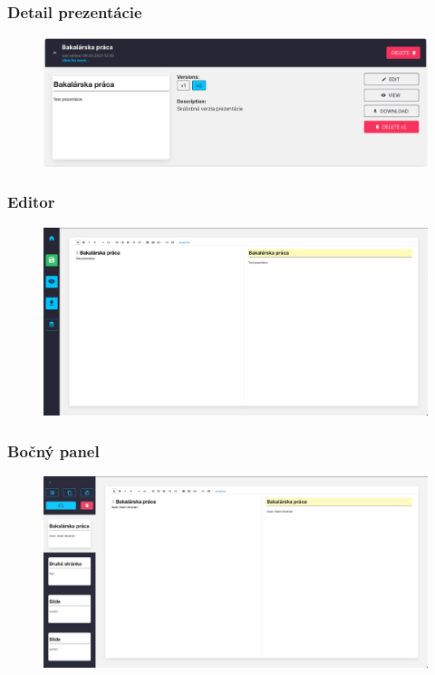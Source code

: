 \documentclass[10pt,xcolor=pdflatex,hyperref={unicode}]{beamer}
\begin{document}
\begin{frame}\frametitle{Detail prezentácie}
    \begin{figure}[!hbt]
        \centering
        \includegraphics[scale=0.35]{img/detail_prezentacie.pdf}
    \end{figure}
\end{frame}

\begin{frame}\frametitle{Editor}
    \begin{figure}[!hbt]
        \centering
        \includegraphics[scale=0.35]{img/editor.pdf}
    \end{figure}
\end{frame}

\begin{frame}\frametitle{Bočný panel}
    \begin{figure}[!hbt]
        \centering
        \includegraphics[scale=0.35]{img/bocny_panel.pdf}
    \end{figure}
\end{frame}
\end{document}
